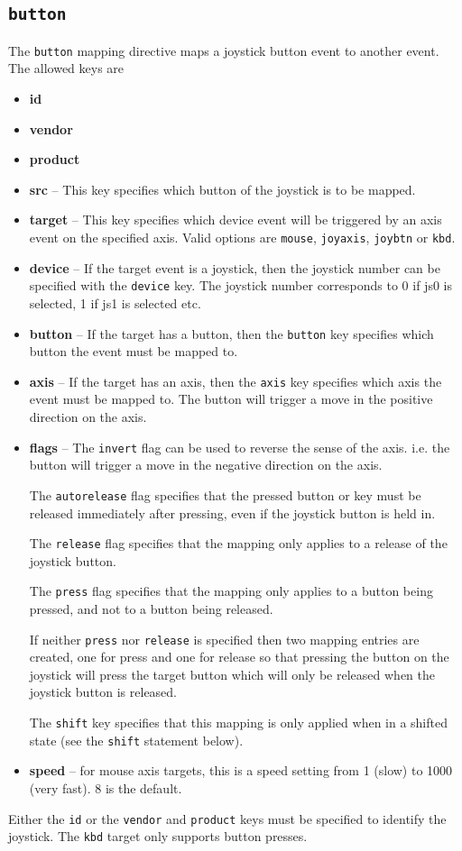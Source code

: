\documentclass{article}
\begin{document}
\subsection{{\tt button}}
The {\tt button} mapping directive maps a joystick button event 
to another event. The allowed keys are 
\begin{itemize}
	\item {\bf id}
	\item {\bf vendor}
	\item {\bf product}
	\item {\bf src} -- This key specifies which button of the joystick is to be mapped.
	\item {\bf target} -- This key specifies which device event will be triggered
				by an axis event on the specified axis. Valid
				options are {\tt mouse}, {\tt joyaxis}, {\tt joybtn} or {\tt kbd}.
	\item {\bf device} -- If the target event is a joystick, then the joystick 
				number can be specified with the {\tt device} key.
				The joystick number corresponds to 0 if js0 is selected, 1 if js1 is selected etc.
	\item {\bf button} -- If the target has a button, then the {\tt button} key specifies
				which button the event must be mapped to.
	\item {\bf axis} -- If the target has an axis, then the {\tt axis} key specifies
				which axis the event must be mapped to. The button
				will trigger a move in the positive direction on the axis.
	\item {\bf flags} -- The {\tt invert} flag can be used to reverse the sense of the
				axis. i.e. the button will trigger a move in the negative 
				direction on the axis.

				The {\tt autorelease} flag specifies that the pressed button or key
				must be released immediately after pressing, even if the joystick
				button is held in.

				The {\tt release} flag specifies that the mapping only applies
				to a release of the joystick button.

				The {\tt press} flag specifies that the mapping only applies
				to a button being pressed, and not to a button being released.

				If neither {\tt press} nor {\tt release} is specified then
				two mapping entries are created, one for press and one for
				release so that pressing the button on the joystick will
				press the target button which will only be released when
				the joystick button is released.
			
				The {\tt shift} key specifies that this mapping is only
				applied when in a shifted state (see the {\tt shift} statement below).
    \item {\bf speed} -- for mouse axis targets, this is a speed setting from 1 (slow) to 1000 (very fast). 8 is the default.
\end{itemize}
Either the {\tt id} or the {\tt vendor} and {\tt product} keys must be specified to identify the
joystick. The {\tt kbd} target only supports button presses.
\end{document}
